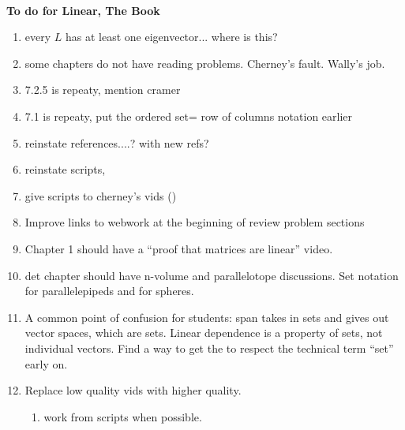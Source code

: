 \documentclass[12pt]{article}
\begin{document}
\thispagestyle{empty}
~
\vspace{-3cm}

\begin{center}
\vspace{-1.5cm}
{\Large{\bfseries  
To do for Linear, The Book
}
 }  
\end{center}



\begin{enumerate}

\item every $L$ has at least one eigenvector... where is this?

\item some chapters do not have reading problems. Cherney's fault. Wally's job.

\item 7.2.5 is repeaty, mention cramer

\item 7.1 is repeaty, put the ordered set= row of columns notation earlier

\item reinstate references....? with new refs?

\item reinstate scripts, 

\item give scripts to cherney's vids ()

\item Improve links to webwork at the beginning of review problem sections

\item Chapter 1 should have a ``proof that matrices are linear'' video. 

\item det chapter should have n-volume and parallelotope discussions. Set notation for parallelepipeds and for spheres.

\item A common point of confusion for students: span takes in sets and gives out vector spaces, which are sets. Linear dependence is a property of sets, not individual vectors. Find a way to get the to respect the technical term ``set'' early on. 

\item Replace low quality vids with higher quality. 
\begin{enumerate}
\item work from scripts when possible.
\end{enumerate}


\end{enumerate}
\end{document}
